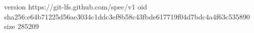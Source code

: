 version https://git-lfs.github.com/spec/v1
oid sha256:e64b71225d56ae3034c1ddc3ef8b58c43fbde617719f04d7bdc4a4f63c535890
size 285209
